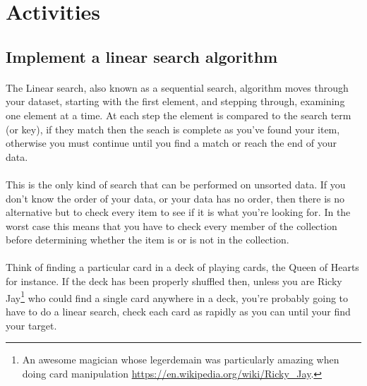 \documentclass[10pt, a4paper, twosize]{article}
\begin{document}
\section{Activities}




\subsection{Implement a linear search algorithm}

\paragraph{} The Linear search, also known as a sequential search, algorithm moves through your dataset, starting with the first element, and stepping through, examining one element at a time. At each step the element is compared to the search term (or key), if they match then the seach is complete as you've found your item, otherwise you must continue until you find a match or reach the end of your data.

\paragraph{} This is the only kind of search that can be performed on unsorted data. If you don't know the order of your data, or your data has no order, then there is no alternative but to check every item to see if it is what you're looking for. In the worst case this means that you have to check every member of the collection before determining whether the item is or is not in the collection.

\paragraph{} Think of finding a particular card in a deck of playing cards, the Queen of Hearts for instance. If the deck has been properly shuffled then, unless you are Ricky Jay\footnote{An awesome magician whose legerdemain was particularly amazing when doing card manipulation \url{https://en.wikipedia.org/wiki/Ricky_Jay}.} who could find a single card anywhere in a deck, you're probably going to have to do a linear search, check each card as rapidly as you can until your find your target. 
\end{document}
